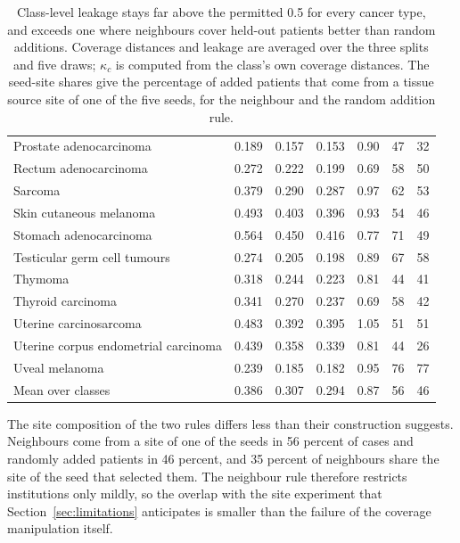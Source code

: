 \begin{table}[htbp]
\begin{tabular}{@{}lrrrrrr@{}}
Prostate adenocarcinoma & 0.189 & 0.157 & 0.153 & 0.90 & 47 & 32 \\
Rectum adenocarcinoma & 0.272 & 0.222 & 0.199 & 0.69 & 58 & 50 \\
Sarcoma & 0.379 & 0.290 & 0.287 & 0.97 & 62 & 53 \\
Skin cutaneous melanoma & 0.493 & 0.403 & 0.396 & 0.93 & 54 & 46 \\
Stomach adenocarcinoma & 0.564 & 0.450 & 0.416 & 0.77 & 71 & 49 \\
Testicular germ cell tumours & 0.274 & 0.205 & 0.198 & 0.89 & 67 & 58 \\
Thymoma & 0.318 & 0.244 & 0.223 & 0.81 & 44 & 41 \\
Thyroid carcinoma & 0.341 & 0.270 & 0.237 & 0.69 & 58 & 42 \\
Uterine carcinosarcoma & 0.483 & 0.392 & 0.395 & 1.05 & 51 & 51 \\
Uterine corpus endometrial carcinoma & 0.439 & 0.358 & 0.339 & 0.81 & 44 & 26 \\
Uveal melanoma & 0.239 & 0.185 & 0.182 & 0.95 & 76 & 77 \\
\midrule
Mean over classes & 0.386 & 0.307 & 0.294 & 0.87 & 56 & 46 \\
\bottomrule
\end{tabular}
\caption{Class-level leakage stays far above the permitted 0.5 for every cancer type, and exceeds one where neighbours cover held-out patients better than random additions. Coverage distances and leakage are averaged over the three splits and five draws; $\kappa_c$ is computed from the class's own coverage distances. The seed-site shares give the percentage of added patients that come from a tissue source site of one of the five seeds, for the neighbour and the random addition rule.}
\label{tab:class-census}
\end{table}

\noindent The site composition of the two rules differs less than their construction suggests. Neighbours come from a site of one of the seeds in 56 percent of cases and randomly added patients in 46 percent, and 35 percent of neighbours share the site of the seed that selected them. The neighbour rule therefore restricts institutions only mildly, so the overlap with the site experiment that Section~\ref{sec:limitations} anticipates is smaller than the failure of the coverage manipulation itself.

